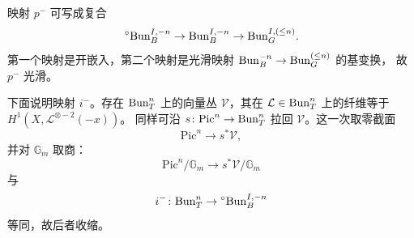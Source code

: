 映射 $p^-$ 可写成复合
\[
{}^{\circ}\mathrm{Bun}^{I,-n}_B\to \mathrm{Bun}^{I,-n}_B\to \mathrm{Bun}^{I,(\le n)}_G .
\]
第一个映射是开嵌入，第二个映射是光滑映射 $\mathrm{Bun}^{-n}_B\to \mathrm{Bun}^{(\le n)}_G$ 的基变换，
故 $p^-$ 光滑。

下面说明映射 $i^-$。存在 $\mathrm{Bun}^n_T$ 上的向量丛 $\mathcal{V}$，其在
$\mathcal{L}\in \mathrm{Bun}^n_T$ 上的纤维等于 $H^1(X,\mathcal{L}^{\otimes -2}(-x))$。
同样可沿 $s\colon \mathrm{Pic}^n\to \mathrm{Bun}^n_T$ 拉回 $\mathcal{V}$。这一次取零截面
\[
\mathrm{Pic}^n\to s^*\mathcal{V},
\]
并对 $\mathbb{G}_m$ 取商：
\[
\mathrm{Pic}^n/\mathbb{G}_m\to s^*\mathcal{V}/\mathbb{G}_m
\]
与
\[
i^-\colon \mathrm{Bun}^n_T\to {}^{\circ}\mathrm{Bun}^{I,-n}_B
\]
等同，故后者收缩。
